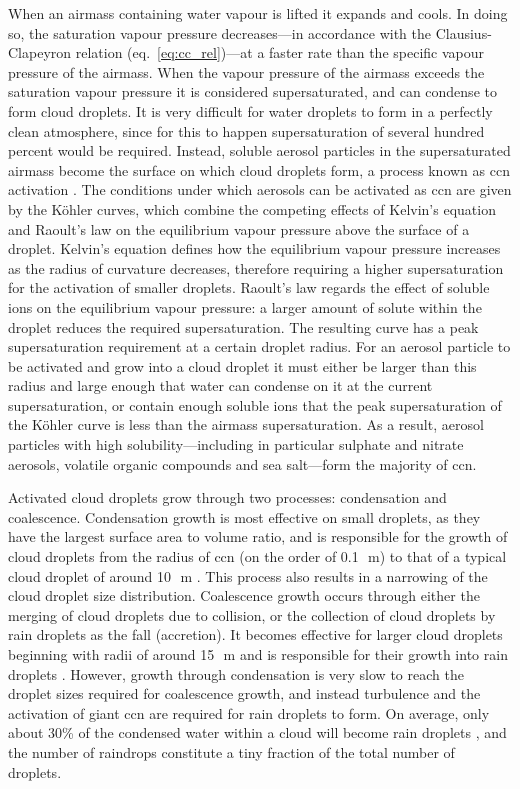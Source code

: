 When an airmass containing water vapour is lifted it expands and cools.
In doing so, the saturation vapour pressure decreases---in accordance with the Clausius-Clapeyron relation (eq.~\ref{eq:cc_rel})---at a faster rate than the specific vapour pressure of the airmass.
When the vapour pressure of the airmass exceeds the saturation vapour pressure it is considered supersaturated, and can condense to form cloud droplets.
It is very difficult for water droplets to form in a perfectly clean atmosphere, since for this to happen supersaturation of several hundred percent would be required.
Instead, soluble aerosol particles in the supersaturated airmass become the surface on which cloud droplets form, a process known as \acrfull{ccn} activation \citep{acci}.
The conditions under which aerosols can be activated as \acrshort{ccn} are given by the K{\"o}hler curves, which combine the competing effects of Kelvin's equation and Raoult's law on the equilibrium vapour pressure above the surface of a droplet. 
Kelvin's equation defines how the equilibrium vapour pressure increases as the radius of curvature decreases, therefore requiring a higher supersaturation for the activation of smaller droplets. 
Raoult's law regards the effect of soluble ions on the equilibrium vapour pressure: a larger amount of solute within the droplet reduces the required supersaturation. The resulting curve has a peak supersaturation requirement at a certain droplet radius. 
For an aerosol particle to be activated and grow into a cloud droplet it must either be larger than this radius and large enough that water can condense on it at the current supersaturation, or contain enough soluble ions that the peak supersaturation of the K{\"o}hler curve is less than the airmass supersaturation.
As a result, aerosol particles with high solubility---including in particular sulphate and nitrate aerosols, volatile organic compounds and sea salt---form the majority of \acrshort{ccn}.

Activated cloud droplets grow through two processes: condensation and coalescence. 
Condensation growth is most effective on small droplets, as they have the largest surface area to volume ratio, and is responsible for the growth of cloud droplets from the radius of \acrshort{ccn} (on the order of 0.1\,\unit{\mu m}) to that of a typical cloud droplet of around 10\,\unit{\mu m} \citep{cloud_physics}. 
This process also results in a narrowing of the cloud droplet size distribution. 
Coalescence growth occurs through either the merging of cloud droplets due to collision, or the collection of cloud droplets by rain droplets as the fall (accretion).
It becomes effective for larger cloud droplets beginning with radii of around 15\,\unit{\mu m} and is responsible for their growth into rain droplets \citep{cloud_physics}.
However, growth through condensation is very slow to reach the droplet sizes required for coalescence growth, and instead turbulence and the activation of giant \acrshort{ccn} \citep{feingold_impact_1999} are required for rain droplets to form.
On average, only about 30\% of the condensed water within a cloud will become rain droplets \citep{trenberth_changing_2003}, and the number of raindrops constitute a tiny fraction of the total number of droplets.


